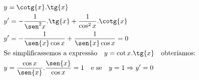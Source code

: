 \begin{ex}
\begin{align}
&y=\cotg{x}.\tg{x}\nonumber\\
&y'=-\frac{1}{\sen^2{x}}.\tg{x}+\frac{1}{\cos^2{x}}.\cotg{x}\nonumber\\
&y'= -\frac{1}{\sen{x}\cos{x}}+\frac{1}{\sen{x}\cos{x}}=0\nonumber\\
&\text{Se simplificassemos a expressão}\quad y=\cot{x}.\tg{x}\quad\text{obteríamos:}\nonumber\\
&y=\frac{\cos{x}}{\sen{x}}.\frac{\sen{x}}{\cos{x}}=1\quad\text{e se}\quad y=1\Rightarrow y'=0\nonumber
\end{align}
\end{ex}